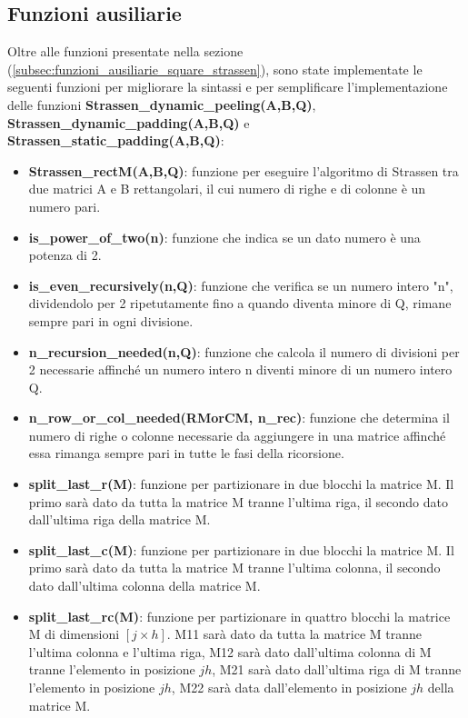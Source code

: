 \documentclass[10pt,a4paper,twoside]{tau-book}
\begin{document}
\subsection{Funzioni ausiliarie}
\label{subsec:ausiliarie_rect_mtrx}

Oltre alle funzioni presentate nella sezione (\ref{subsec:funzioni_ausiliarie_square_strassen}), sono state implementate le seguenti funzioni per migliorare la sintassi e per semplificare l'implementazione delle funzioni \textbf{Strassen\_dynamic\_peeling(A,B,Q)}, \textbf{Strassen\_dynamic\_padding(A,B,Q)} e \textbf{Strassen\_static\_padding(A,B,Q)}:

\begin{itemize}
    \item \textbf{Strassen\_rectM(A,B,Q)}: funzione per eseguire l'algoritmo di Strassen tra due matrici A e B rettangolari, il cui numero di righe e di colonne è un numero pari.
    \item \textbf{is\_power\_of\_two(n)}: funzione che indica se un dato numero è una potenza di 2.
    \item \textbf{is\_even\_recursively(n,Q)}: funzione che verifica se un numero intero "n", dividendolo per 2 ripetutamente fino a quando diventa minore di Q, rimane sempre pari in ogni divisione.
    \item \textbf{n\_recursion\_needed(n,Q)}: funzione che calcola il numero di divisioni per 2 necessarie affinché un numero intero n diventi minore di un numero intero Q.
    \item \textbf{n\_row\_or\_col\_needed(RMorCM, n\_rec)}: funzione che determina il numero di righe o colonne necessarie da aggiungere in una matrice affinché essa rimanga sempre pari in tutte le fasi della ricorsione.
    \item \textbf{split\_last\_r(M)}: funzione per partizionare in due blocchi la matrice M. Il primo sarà dato da tutta la matrice M tranne l'ultima riga, il secondo dato dall'ultima riga della matrice M.
    \item \textbf{split\_last\_c(M)}: funzione per partizionare in due blocchi la matrice M. Il primo sarà dato da tutta la matrice M tranne l'ultima colonna, il secondo dato dall'ultima colonna della matrice M.
    \item \textbf{split\_last\_rc(M)}: funzione per partizionare in quattro blocchi la matrice M di dimensioni $[j\times h]$. M11 sarà dato da tutta la matrice M tranne l'ultima colonna e l'ultima riga, M12 sarà dato dall'ultima colonna di M tranne l'elemento in posizione $jh$, M21 sarà dato dall'ultima riga di M tranne l'elemento in posizione $jh$, M22 sarà data dall'elemento in posizione $jh$ della matrice M.
\end{itemize}
\end{document}
